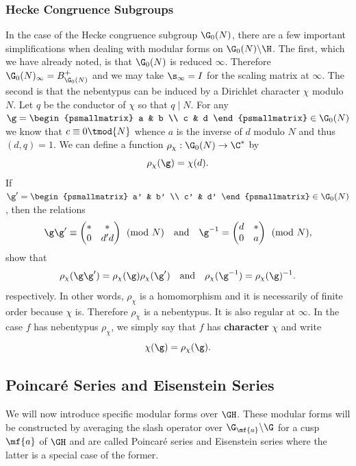 \documentclass[12pt]{article}
\begin{document}
      \subsubsection*{Hecke Congruence Subgroups}
        In the case of the Hecke congruence subgroup \(\G_{0}(N)\), there are a few important simplifications when dealing with modular forms on  \(\G_{0}(N)\backslash\H\). The first, which we have already noted, is that \(\G_{0}(N)\) is reduced \(\infty\). Therefore \(\G_{0}(N)_{\infty} = B_{\G_{0}(N)}^{+}\) and we may take \(\s_{\infty} = I\) for the scaling matrix at \(\infty\). The second is that the nebentypus can be induced by a Dirichlet character \(\chi\) modulo \(N\). Let \(q\) be the conductor of \(\chi\) so that \(q \mid N\). For any \(\g = \begin{psmallmatrix} a & b \\ c & d \end{psmallmatrix} \in \G_{0}(N)\) we know that \(c \equiv 0 \tmod{N}\) whence \(a\) is the inverse of \(d\) modulo \(N\) and thus \((d,q) = 1\). We can define a function \(\rho_{\chi}:\G_{0}(N) \to \C^{\ast}\) by
        \[
          \rho_{\chi}(\g) = \chi(d).
        \]
        If \(\g' = \begin{psmallmatrix} a' & b' \\ c' & d' \end{psmallmatrix} \in \G_{0}(N)\), then the relations
        \[
          \g\g' \equiv \begin{pmatrix} \ast & \ast \\ 0 & d'd \end{pmatrix} \pmod{N} \quad \text{and} \quad \g^{-1} = \begin{pmatrix} d & \ast \\ 0 & a \end{pmatrix} \pmod{N},
        \]
        show that
        \[
          \rho_{\chi}(\g\g') = \rho_{\chi}(\g)\rho_{\chi}(\g') \quad \text{and} \quad \rho_{\chi}(\g^{-1}) = \rho_{\chi}(\g)^{-1}.
        \]
        respectively. In other words, \(\rho_{\chi}\) is a homomorphism and it is necessarily of finite order because \(\chi\) is. Therefore \(\rho_{\chi}\) is a nebentypus. It is also regular at \(\infty\). In the case \(f\) has nebentypus \(\rho_{\chi}\), we simply say that \(f\) has \textbf{character} \(\chi\) and write
        \[
          \chi(\g) = \rho_{\chi}(\g).
        \]
    \subsection{Poincar\'e Series and Eisenstein Series}
      We will now introduce specific modular forms over \(\GH\). These modular forms will be constructed by averaging the slash operator over \(\G_{\mf{a}}\backslash\G\) for a cusp \(\mf{a}\) of \(\GH\) and are called Poincar\'e series and Eisenstein series where the latter is a special case of the former. 
      
\end{document}
